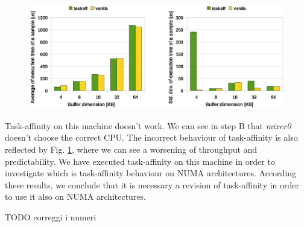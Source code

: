 \begin{figure}[htbp]
\centering
\includegraphics[width=\widefigure]{images/results_AMD/time_avg_var_AMD.eps}
\caption{}
\label{fig:time_avg_var_AMD}
\end{figure}

Task-affinity on this machine doesn't work. We can see in step B that \textit{mixer0} doesn't choose the correct CPU. The incorrect behaviour of 
task-affinity is also reflected by Fig. \ref{fig:time_avg_var_AMD}, where we can see a worsening of throughput and predictability. We have executed 
task-affinity on this machine in order to investigate which is task-affinity behaviour on NUMA architectures. According these results, we conclude that 
it is necessary a revision of task-affinity in order to use it also on NUMA architectures.

TODO correggi i numeri
\begin{table}[tbp]
\centering%
\hspace{4em}
\label{tab:final_speedup}
\caption{Comparison between task-affinity and vanilla on Intel Xeon and Intel i7}
\end{table}

